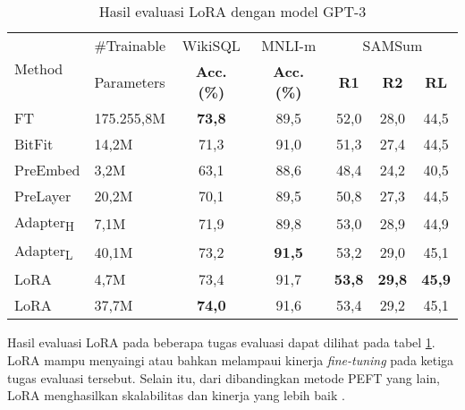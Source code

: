 \begin{table}[ht]
    \vspace{0.25cm}
    \centering
    \caption{Hasil evaluasi LoRA dengan model GPT-3 \parencite{lora}}
    \label{table:lora_result}
    \begin{tabular}{l|l|ccccc}
        \toprule
        \multirow{2}{*}{Method} & \#Trainable & WikiSQL & MNLI-m & \multicolumn{3}{c}{SAMSum} \\
         & Parameters & \textbf{Acc. (\%)} & \textbf{Acc. (\%)} & \textbf{R1} & \textbf{R2} & \textbf{RL} \\
        \midrule
        FT & 175.255,8M & \textbf{73,8} & 89,5 & 52,0 & 28,0 & 44,5 \\
        BitFit & 14,2M & 71,3 & 91,0 & 51,3 & 27,4 & 44,5 \\
        PreEmbed & 3,2M & 63,1 & 88,6 & 48,4 & 24,2 & 40,5 \\
        PreLayer & 20,2M & 70,1 & 89,5 & 50,8 & 27,3 & 44,5 \\
        Adapter\textsubscript{H}  & 7,1M & 71,9 & 89,8 & 53,0 & 28,9 & 44,9 \\
        Adapter\textsubscript{L}  & 40,1M & 73,2 & \textbf{91,5} & 53,2 & 29,0 & 45,1 \\
        LoRA  & 4,7M & 73,4 & 91,7 & \textbf{53,8} & \textbf{29,8} & \textbf{45,9} \\
        LoRA  & 37,7M & \textbf{74,0} & 91,6 & 53,4 & 29,2 & 45,1 \\
        \bottomrule
    \end{tabular}
\end{table}

Hasil evaluasi LoRA pada beberapa tugas evaluasi dapat dilihat pada tabel \ref{table:lora_result}. LoRA mampu menyaingi atau bahkan melampaui kinerja \textit{fine-tuning} pada ketiga tugas evaluasi tersebut. Selain itu, dari dibandingkan metode PEFT yang lain, LoRA menghasilkan skalabilitas dan kinerja yang lebih baik \parencite{lora}.
